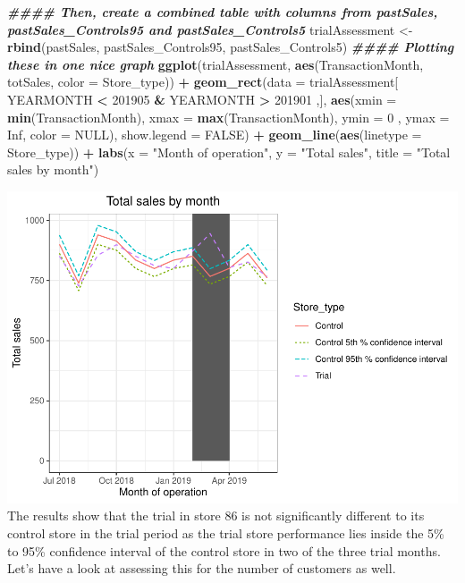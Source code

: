\documentclass[
]{article}
\newenvironment{Shaded}{\begin{snugshade}}{\end{snugshade}}
\newcommand{\AttributeTok}[1]{\textcolor[rgb]{0.13,0.29,0.53}{#1}}
\newcommand{\ConstantTok}[1]{\textcolor[rgb]{0.56,0.35,0.01}{#1}}
\newcommand{\DecValTok}[1]{\textcolor[rgb]{0.00,0.00,0.81}{#1}}
\newcommand{\DocumentationTok}[1]{\textcolor[rgb]{0.56,0.35,0.01}{\textbf{\textit{#1}}}}
\newcommand{\FunctionTok}[1]{\textcolor[rgb]{0.13,0.29,0.53}{\textbf{#1}}}
\newcommand{\NormalTok}[1]{#1}
\newcommand{\OtherTok}[1]{\textcolor[rgb]{0.56,0.35,0.01}{#1}}
\newcommand{\SpecialCharTok}[1]{\textcolor[rgb]{0.81,0.36,0.00}{\textbf{#1}}}
\newcommand{\StringTok}[1]{\textcolor[rgb]{0.31,0.60,0.02}{#1}}
\begin{document}
\begin{Shaded}
\begin{Highlighting}[]
\DocumentationTok{\#\#\#\# Then, create a combined table with columns from pastSales, pastSales\_Controls95 and pastSales\_Controls5}
\NormalTok{trialAssessment }\OtherTok{\textless{}{-}} \FunctionTok{rbind}\NormalTok{(pastSales, pastSales\_Controls95, pastSales\_Controls5)}
\DocumentationTok{\#\#\#\# Plotting these in one nice graph}
\FunctionTok{ggplot}\NormalTok{(trialAssessment, }\FunctionTok{aes}\NormalTok{(TransactionMonth, totSales, }\AttributeTok{color =}\NormalTok{ Store\_type)) }\SpecialCharTok{+}
  \FunctionTok{geom\_rect}\NormalTok{(}\AttributeTok{data =}\NormalTok{ trialAssessment[ YEARMONTH }\SpecialCharTok{\textless{}} \DecValTok{201905} \SpecialCharTok{\&}\NormalTok{ YEARMONTH }\SpecialCharTok{\textgreater{}} \DecValTok{201901}\NormalTok{ ,],}
\FunctionTok{aes}\NormalTok{(}\AttributeTok{xmin =} \FunctionTok{min}\NormalTok{(TransactionMonth), }\AttributeTok{xmax =} \FunctionTok{max}\NormalTok{(TransactionMonth), }\AttributeTok{ymin =} \DecValTok{0}\NormalTok{ , }\AttributeTok{ymax =}
\ConstantTok{Inf}\NormalTok{, }\AttributeTok{color =} \ConstantTok{NULL}\NormalTok{), }\AttributeTok{show.legend =} \ConstantTok{FALSE}\NormalTok{) }\SpecialCharTok{+}
  \FunctionTok{geom\_line}\NormalTok{(}\FunctionTok{aes}\NormalTok{(}\AttributeTok{linetype =}\NormalTok{ Store\_type)) }\SpecialCharTok{+}
  \FunctionTok{labs}\NormalTok{(}\AttributeTok{x =} \StringTok{"Month of operation"}\NormalTok{, }\AttributeTok{y =} \StringTok{"Total sales"}\NormalTok{, }\AttributeTok{title =} \StringTok{"Total sales by month"}\NormalTok{)}
\end{Highlighting}
\end{Shaded}

\includegraphics{InsideSherpa_Task2_files/figure-latex/unnamed-chunk-19-1}
The results show that the trial in store 86 is not significantly
different to its control store in the trial period as the trial store
performance lies inside the 5\% to 95\% confidence interval of the
control store in two of the three trial months. Let's have a look at
assessing this for the number of customers as well.
\end{document}
